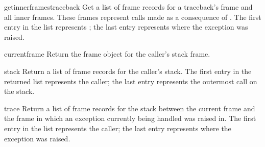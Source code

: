 \begin{funcdesc}{getinnerframes}{traceback}
  Get a list of frame records for a traceback's frame and all inner
  frames.  These frames represent calls made as a consequence of
  .  The first entry in the list represents
  ; the last entry represents where the exception was
  raised.
\end{funcdesc}

\begin{funcdesc}{currentframe}{}
  Return the frame object for the caller's stack frame.
\end{funcdesc}

\begin{funcdesc}{stack}{}
  Return a list of frame records for the caller's stack.  The first
  entry in the returned list represents the caller; the last entry
  represents the outermost call on the stack.
\end{funcdesc}

\begin{funcdesc}{trace}{}
  Return a list of frame records for the stack between the current
  frame and the frame in which an exception currently being handled
  was raised in.  The first entry in the list represents the caller;
  the last entry represents where the exception was raised.
\end{funcdesc}
